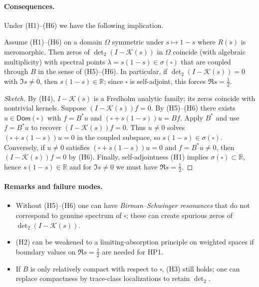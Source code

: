 \paragraph{Consequences.}
Under (H1)–(H6) we have the following implication.
\begin{proposition}[BS correspondence to HP2]\label{prop:BS-HP2}
Assume \textup{(H1)}–\textup{(H6)} on a domain $\Omega$ symmetric under $s\mapsto1-s$ where $R(s)$ is meromorphic. Then zeros of $\det_2(I-\mathcal K(s))$ in $\Omega$ coincide (with algebraic multiplicity) with spectral points $\lambda=s(1-s)\in\sigma(\square)$ that are coupled through $B$ in the sense of \textup{(H5)}–\textup{(H6)}. In particular, if $\det_2(I-\mathcal K(s))=0$ with $\Im s\ne0$, then $s(1-s)\in\mathbb R$; since $\square$ is self-adjoint, this forces $\Re s=\tfrac12$.
\end{proposition}
\begin{proof}[Sketch]
By (H4), $I-\mathcal K(s)$ is a Fredholm analytic family; its zeros coincide with nontrivial kernels. Suppose $(I-\mathcal K(s))f=0$. By (H5)–(H6) there exists $u\in\mathsf{Dom}(\square)$ with $f=B^*u$ and $(\square+s(1-s))u=Bf$. Apply $B^*$ and use $f=B^*u$ to recover $(I-\mathcal K(s))f=0$. Thus $u\ne0$ solves $(\square+s(1-s))u=0$ in the coupled subspace, so $s(1-s)\in\sigma(\square)$. Conversely, if $u\ne0$ satisfies $(\square+s(1-s))u=0$ and $f=B^*u\ne0$, then $(I-\mathcal K(s))f=0$ by (H6). Finally, self-adjointness (H1) implies $\sigma(\square)\subset\mathbb R$, hence $s(1-s)\in\mathbb R$ and for $\Im s\ne0$ we must have $\Re s=\tfrac12$.
\end{proof}


\paragraph{Remarks and failure modes.}
\begin{itemize}
\item Without (H5)–(H6) one can have \emph{Birman–Schwinger resonances} that do not correspond to genuine spectrum of $\square$; these can create spurious zeros of $\det_2(I-\mathcal K(s))$.
\item (H2) can be weakened to a limiting-absorption principle on weighted spaces if boundary values on $\Re s=\tfrac12$ are needed for HP1.
\item If $B$ is only relatively compact with respect to $\square$, (H3) still holds; one can replace compactness by trace-class localizations to retain $\det_2$.
\end{itemize}


